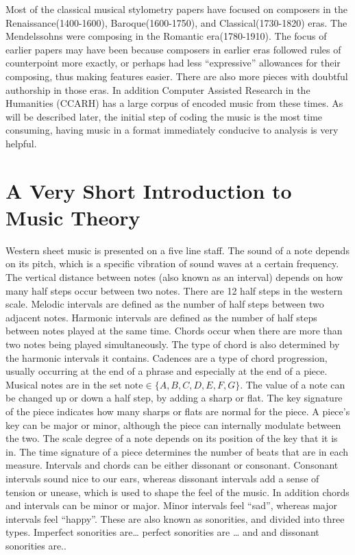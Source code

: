 \documentclass[12pt,twoside]{reedthesis}
\theoremstyle{definition}
\theoremstyle{definition}
\theoremstyle{definition}
\theoremstyle{remark}
\begin{document}
Most of the classical musical stylometry papers have focused on
composers in the Renaissance(1400-1600), Baroque(1600-1750), and
Classical(1730-1820) eras. The Mendelssohns were composing in the
Romantic era(1780-1910). The focus of earlier papers may have been
because composers in earlier eras followed rules of counterpoint more
exactly, or perhaps had less ``expressive'' allowances for their
composing, thus making features easier. There are also more pieces with
doubtful authorship in those eras. In addition Computer Assisted
Research in the Humanities (CCARH) has a large corpus of encoded music
from these times. As will be described later, the initial step of coding
the music is the most time consuming, having music in a format
immediately conducive to analysis is very helpful.

\section{A Very Short Introduction to Music
Theory}\label{a-very-short-introduction-to-music-theory}

Western sheet music is presented on a five line staff. The sound of a
note depends on its pitch, which is a specific vibration of sound waves
at a certain frequency. The vertical distance between notes (also known
as an interval) depends on how many half steps occur between two notes.
There are 12 half steps in the western scale. Melodic intervals are
defined as the number of half steps between two adjacent notes. Harmonic
intervals are defined as the number of half steps between notes played
at the same time. Chords occur when there are more than two notes being
played simultaneously. The type of chord is also determined by the
harmonic intervals it contains. Cadences are a type of chord
progression, usually occurring at the end of a phrase and especially at
the end of a piece. Musical notes are in the set
\(\text{note} \in \{A,B,C,D,E,F,G\}\). The value of a note can be
changed up or down a half step, by adding a sharp or flat. The key
signature of the piece indicates how many sharps or flats are normal for
the piece. A piece's key can be major or minor, although the piece can
internally modulate between the two. The scale degree of a note depends
on its position of the key that it is in. The time signature of a piece
determines the number of beats that are in each measure. Intervals and
chords can be either dissonant or consonant. Consonant intervals sound
nice to our ears, whereas dissonant intervals add a sense of tension or
unease, which is used to shape the feel of the music. In addition chords
and intervals can be minor or major. Minor intervals feel ``sad'',
whereas major intervals feel ``happy''. These are also known as
sonorities, and divided into three types. Imperfect sonorities
are\ldots{} perfect sonorities are \ldots{} and and dissonant sonorities
are..
\end{document}
